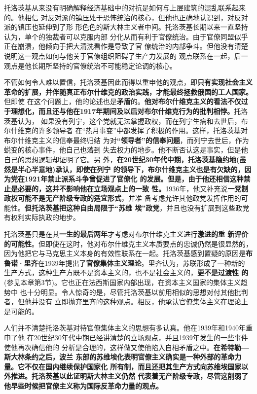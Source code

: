 托洛茨基从来没有明确解释经济基础中的对抗是如何与上层建筑的混乱联系起来的。他相信
对反对派的镇压处于恐怖统治的核心，但他也正确地认识到，对反对派的镇压也延伸到了形
形色色的斯大林主义者中间。托洛茨基长期以来一直坚持认为，单个的独裁者可以克服内部
分化从而有利于官僚统治。由于官僚同盟似乎正在崩溃，他倾向于把大清洗看作是导致了官
僚统治的内部争斗。但他没有清楚说明这一观点如何与他关于官僚组织阻碍了生产力发展的
观点联系在一起，后一观点是他长期所坚持的官僚统治不可能稳定论调的核心。

不管如何令人难以置信，托洛茨基因此而得以重申他的观点，即\textbf{只有实现社会主义
  革命的扩展，并伴随真正布尔什维克的政治实践，才能最终拯救俄国的工人国家。}但即使
在这个问题上，他的论述也是\textbf{矛盾}的。\textbf{他对布尔什维克主义的看法不仅过
  于理想化，而且还与他在1917年期间及以后对布尔什维克行为的批判相悖。}托洛茨基认为，
如果没有列宁，这个党就无法掌握政权，而在列宁生病和去世后，布尔什维克的许多领导者
在“热月事变”中都发挥了积极的作用。这样，托洛茨基对布尔什维克主义的信奉最终归结
为对\textbf{“领导者”的信奉问题}，而列宁去世后，作为蜕变的核心事件，他自己也落到
失去权力的地步。他不断否认这是事实，但是他自己的思想逻辑却证明了它。另
外，\textbf{在20世纪30年代中期，托洛茨基隐约地(虽然是半心半意地)承认，即使在列宁
  的领导下，布尔什维克主义也是有欠缺的，因为党在1921年禁止派系斗争曾促进了官僚化
  的发展。但是，由于他还相信这种禁止是必要的，这并不影响他在立场观点上的一致
  性。}1936年，他又补充说\textbf{一党制政权可能不是无产阶级专政的适宜形式}，并准
备考虑允许其他政党发挥作用的可能性。\textbf{但托洛茨基把这种自由局限于“苏维
  埃”政党}，并且也没有扩展到这些政党有权利实际执政的地步。

托洛茨基只是在其\textbf{一生的最后两年}才考虑对布尔什维克主义进行\textbf{激进的重
  新评价的可能性}。但即使在这时，他对布尔什维克主义本质要点的忠诚仍然是很显然的，
因为他把它与马克思主义本身的有效性联系在一起。托洛茨基感到置疑的原因是\textbf{布
  鲁诺·里齐}在1939年提出了\textbf{官僚集体主义理论}。里齐认为，苏联形成了一种新的
生产方式，这种生产方既不是资本主义的，也不是社会主义的，\textbf{更不是过渡性
  的}(参见本章第3节)。它也正在法西斯国家内部出现，在资本主义国家的集体主义趋势中
也十分明显。令人惊奇的是，尽管托洛茨基以前用相似的思想对付其他批判者，但他并没有
立即抛弃里齐的这种观点。相反，他承认官僚集体主义在理论上是可能的。

人们并不清楚托洛茨基对待官僚集体主义的思想有多认真。他在1939年和1940年重申了他
在20世纪30年代中期已经讲清楚的立场观点，并且1939年发生的一些事件使他再次确信他的
分析是合理的，这样做又使他陷入自相矛盾之中。\textbf{在希特勒—斯大林条约之后，波兰
  东部的苏维埃化表明官僚主义确实是一种外部的革命力量。它不仅在国内继续保护国家化
  所有制，而且还把其生产方式向苏维埃国家以外推进。托洛茨基以此证明斯大林主义仍然
  代表着无产阶级专政，尽管这削弱了他早些时候把官僚主义称为国际反革命力量的观点。}

